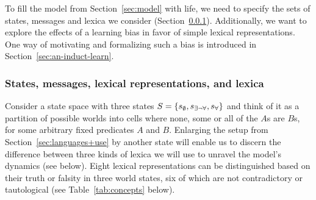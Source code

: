 \documentclass[a4paper, 11pt]{article}
\theoremstyle{Satz}
\newcommand{\set}[1]{\left\{#1\right\}}
\newcommand{\States}{\ensuremath{S}\xspace}		%
\newcommand{\state}{\ensuremath{s}\xspace}		%
\newcommand{\mystate}[1]{\ensuremath{\state_{\text{#1}}}\xspace} %
\newcommand{\ssome}{\mystate{\ensuremath{\exists\neg\forall}}}
\newcommand{\sall}{\mystate{\ensuremath{\forall}}}
\newcommand{\snone}{\mystate{\ensuremath{\emptyset}}}
\begin{document}
To fill the model from Section~\ref{sec:model} with life, we need to specify the sets of
states, messages and lexica we consider (Section~\ref{sec:stat-mess-conc}). Additionally, we want to
explore the effects of a learning bias in favor of simple lexical representations. One way of
motivating and formalizing such a bias is introduced in Section~\ref{sec:an-induct-learn}.


\subsubsection{States, messages, lexical representations, and lexica} 
\label{sec:stat-mess-conc}


Consider a state space with three states $\States = \set{\snone, \ssome, \sall}$ and think of
it as a partition of possible worlds into cells where none, some or all of the $A$s are $B$s,
for some arbitrary fixed predicates $A$ and $B$. Enlarging the setup from Section~\ref{sec:languages+use} by another state will enable us to discern the difference between three kinds of lexica we will use to unravel the model's dynamics (see below). Eight lexical representations can be distinguished based on their truth or falsity in three world states, six of which are not contradictory or tautological (see Table~\ref{tab:concepts} below).
\end{document}
